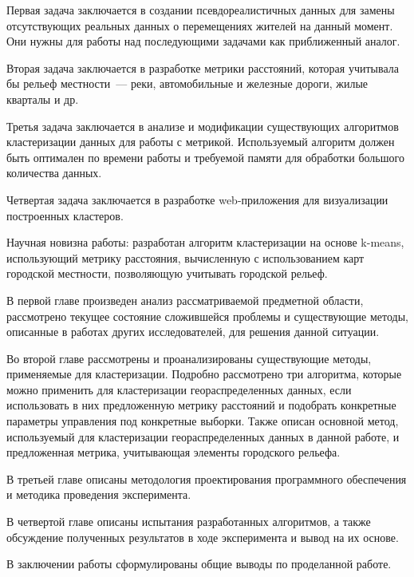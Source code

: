 Первая задача заключается в создании псевдореалистичных данных для замены отсутствующих реальных данных о перемещениях жителей на данный момент. Они нужны для работы над последующими задачами как приближенный аналог.

Вторая задача заключается в разработке метрики расстояний, которая учитывала бы рельеф местности~--- реки, автомобильные и железные дороги, жилые кварталы и др.

Третья задача заключается в анализе и модификации существующих алгоритмов кластеризации данных для работы с метрикой. Используемый алгоритм должен быть оптимален по времени работы и требуемой памяти для обработки большого количества данных.

Четвертая задача заключается в разработке web-приложения для визуализации построенных кластеров.

Научная новизна работы: разработан алгоритм кластеризации на основе k-means, использующий метрику расстояния, вычисленную с использованием карт городской местности, позволяющую учитывать городской рельеф.

В первой главе произведен анализ рассматриваемой предметной области, рассмотрено текущее состояние сложившейся проблемы и существующие методы, описанные в работах других исследователей, для решения данной ситуации.

Во второй главе рассмотрены и проанализированы существующие методы, применяемые для кластеризации. Подробно рассмотрено три алгоритма, которые можно применить для кластеризации геораспределенных данных, если использовать в них предложенную метрику расстояний и подобрать конкретные параметры управления под конкретные выборки. Также описан основной метод, используемый для кластеризации геораспределенных данных в данной работе, и предложенная метрика, учитывающая элементы городского рельефа.

В третьей главе описаны методология проектирования программного обеспечения и методика проведения эксперимента.

В четвертой главе описаны испытания разработанных алгоритмов, а также обсуждение полученных результатов в ходе эксперимента и вывод на их основе.

В заключении работы сформулированы общие выводы по проделанной работе.
